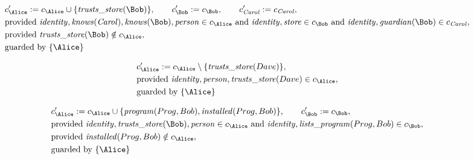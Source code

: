 \begin{align*}
&
c'_
{
\Alice
}
 := 
c_
{
\Alice
}
 \cup 
\{
\mathit{\detokenize{
trusts_store
}}
(
\Bob
)
\}
, \qquad 
c'_
{
\Bob
}
 := 
c_
{
\Bob
}
, \qquad 
c'_
{
\mathit{Carol}
}
 := 
c_
{
\mathit{Carol}
}
,\\
&
\text{provided } 
\mathit{\detokenize{
identity
}}
,
\mathit{\detokenize{
knows
}}
(
\mathit{Carol}
)
,
\mathit{\detokenize{
knows
}}
(
\Bob
)
,
\mathit{\detokenize{
person
}}
 \in c_
{
\Alice
}
 \text{ and } 
\mathit{\detokenize{
identity
}}
,
\mathit{\detokenize{
store
}}
 \in c_
{
\Bob
}
 \text{ and } 
\mathit{\detokenize{
identity
}}
,
\mathit{\detokenize{
guardian
}}
(
\Bob
)
 \in c_
{
\mathit{Carol}
}
,\\
&
\text{provided } 
\mathit{\detokenize{
trusts_store
}}
(
\Bob
)
 \notin c_
{
\Alice
}
,\\
&
\text{guarded by } \{
\Alice
\}
\end{align*}

\begin{align*}
&
c'_
{
\Alice
}
 := 
c_
{
\Alice
}
 \setminus 
\{
\mathit{\detokenize{
trusts_store
}}
(
Dave
)
\}
,\\
&
\text{provided } 
\mathit{\detokenize{
identity
}}
,
\mathit{\detokenize{
person
}}
,
\mathit{\detokenize{
trusts_store
}}
(
Dave
)
 \in c_
{
\Alice
}
,\\
&
\text{guarded by } \{
\Alice
\}
\end{align*}

\begin{align*}
&
c'_
{
\Alice
}
 := 
c_
{
\Alice
}
 \cup 
\{
\mathit{\detokenize{
program
}}
(
Prog
,
Bob
)
,
\mathit{\detokenize{
installed
}}
(
Prog
,
Bob
)
\}
, \qquad 
c'_
{
\Bob
}
 := 
c_
{
\Bob
}
,\\
&
\text{provided } 
\mathit{\detokenize{
identity
}}
,
\mathit{\detokenize{
trusts_store
}}
(
\Bob
)
,
\mathit{\detokenize{
person
}}
 \in c_
{
\Alice
}
 \text{ and } 
\mathit{\detokenize{
identity
}}
,
\mathit{\detokenize{
lists_program
}}
(
Prog
,
Bob
)
 \in c_
{
\Bob
}
,\\
&
\text{provided } 
\mathit{\detokenize{
installed
}}
(
Prog
,
Bob
)
 \notin c_
{
\Alice
}
,\\
&
\text{guarded by } \{
\Alice
\}
\end{align*}
